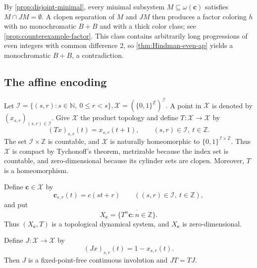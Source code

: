 \documentclass[reqno,12pt]{amsart}
\newcommand{\Nzero}{\mathbb N_0}
\newcommand{\two}{\{0,1\}}
\newcommand{\cX}{\mathcal X}
\def \N {\mathbb N}
\def \Z {\mathbb Z}
\numberwithin{equation}{section}
\begin{document}
By \cref{prop:disjoint-minimal}, every minimal subsystem
$M\subseteq\omega(\mathbf c)$ satisfies $M\cap JM=\emptyset$.
A clopen separation of $M$ and $JM$ then produces a factor coloring $h$
with no monochromatic $B+B$ and with a thick color class; see
\cref{prop:counterexample-factor}.  This class contains arbitrarily long
progressions of even integers with common difference $2$, so
\cref{thm:Hindman-even-ap} yields a monochromatic $B+B$, a contradiction.


\subsection{The affine encoding}
Let
$
\mathcal I=\{(s,r):s\in\N,\ 0\leq r<s\},
\mathcal X=(\two^{\Z})^{\mathcal I}.
$ A point in $\mathcal X$ is denoted by
$(x_{s,r})_{(s,r)\in\mathcal I}$.
Give $\mathcal X$ the product topology and define
$T:\mathcal X\to\mathcal X$ by
$$
(Tx)_{s,r}(t)=x_{s,r}(t+1),
\qquad (s,r)\in\mathcal I,\ t\in\Z.
$$
The set $\mathcal I\times\Z$ is countable, and $\mathcal X$ is naturally
homeomorphic to $\two^{\mathcal I\times\Z}$. Thus $\mathcal X$ is
compact by Tychonoff's theorem, metrizable because the index set is
countable, and zero-dimensional because its cylinder sets are clopen.
Moreover, $T$ is a homeomorphism.

Define $\mathbf c\in\mathcal X$ by
\[
\mathbf c_{s,r}(t)=c(st+r)
\qquad((s,r)\in\mathcal I,\ t\in\Z),
\]
and put
\begin{equation}\label{eq:bold-c}
X_{\mathbf c}=\overline{\{T^n\mathbf c:n\in\Z\}}.
\end{equation}
Thus $(X_{\mathbf c},T)$ is a topological dynamical system, and
$X_{\mathbf c}$ is zero-dimensional.

Define
$J:\mathcal X\to\mathcal X$ by
\begin{equation}\label{eq:J}
(Jx)_{s,r}(t)=1-x_{s,r}(t).
\end{equation}
Then $J$ is a fixed-point-free continuous involution and  $JT=TJ$.
\end{document}
